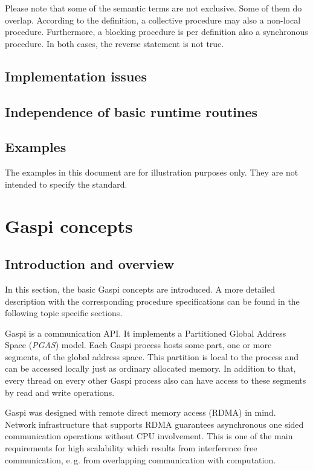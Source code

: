 \documentclass{article}
\newlength{\st}\setlength{\st}{0pt}
\newcommand{\GASPI}{{\sc Gaspi}}
\begin{document}
Please note that some of the semantic terms are not exclusive. Some of
them do overlap. According to the definition, a collective procedure
may also a non-local procedure. Furthermore, a blocking procedure is
per definition also a synchronous procedure. In both cases, the
reverse statement is not true.

\subsection{Implementation issues}

\subsection{Independence of basic runtime routines}

\subsection{Examples}

The examples in this document are for illustration purposes only. They are not intended
to specify the standard. 


\section{\GASPI{} concepts}

\subsection{Introduction and overview}

In this section, the basic \GASPI{} concepts are introduced. A more detailed
description with the corresponding procedure specifications can be found
in the following topic specific sections.

\GASPI{} is a communication API.  It implements a Partitioned Global
Address Space (\emph{PGAS}) model. Each \GASPI{} process hosts some
part, one or more segments, of the global address space. This
partition is local to the process and can be accessed locally just as
ordinary allocated memory. In addition to that, every thread on every
other \GASPI{} process also can have access to these segments by read
and write operations.

\GASPI{} was designed with remote direct memory access (RDMA) in mind.
Network infrastructure that supports RDMA guarantees asynchronous one
sided communication operations without CPU involvement. This is one of
the main requirements for high scalability which results from
interference free communication, e.\,g. from overlapping communication
with computation.
\end{document}
